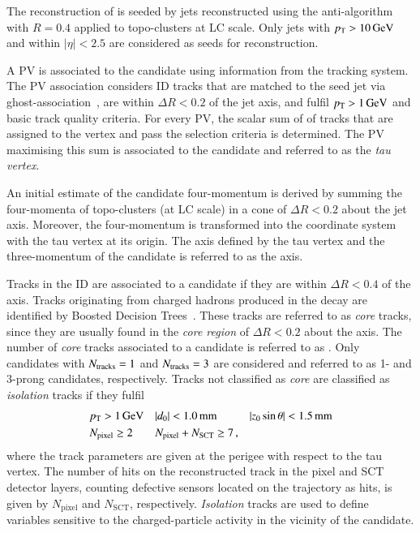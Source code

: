 The reconstruction of \tauhadvis is seeded by jets reconstructed using the
anti-\kt algorithm with $R = 0.4$ applied to topo-clusters at LC scale. Only
jets with $\pT > \SI{10}{\GeV}$ and within $|\eta| < 2.5$ are considered as
seeds for \tauhadvis reconstruction.

A PV is associated to the \tauhadvis candidate using information from the
tracking system. The PV association considers ID tracks that are matched to the
seed jet via ghost-association~\cite{Cacciari:2008gn}, are within
$\Delta R < 0.2$ of the jet axis, and fulfil $\pT > \SI{1}{\GeV}$ and basic
track quality criteria. For every PV, the scalar sum of \pT of tracks that are
assigned to the vertex and pass the selection criteria is determined. The PV
maximising this sum is associated to the \tauhadvis candidate and referred to as
the \emph{tau vertex}.

An initial estimate of the \tauhadvis candidate four-momentum is derived by
summing the four-momenta of topo-clusters (at LC scale) in a cone of
$\Delta R < 0.2$ about the jet axis. Moreover, the four-momentum is transformed
into the coordinate system with the tau vertex at its origin. The axis defined
by the tau vertex and the three-momentum of the \tauhadvis candidate is referred
to as the \tauhadvis axis.

Tracks in the ID are associated to a \tauhadvis candidate if they are within
$\Delta R < 0.4$ of the \tauhadvis axis. Tracks originating from charged hadrons
produced in the \taulepton decay are identified by Boosted Decision
Trees~\cite{duschinger}. These tracks are referred to as \emph{core} tracks,
since they are usually found in the \emph{core region} of $\Delta R < 0.2$ about
the \tauhadvis axis. The number of \emph{core} tracks associated to a \tauhadvis
candidate is referred to as \Ntracks. Only candidates with $N_{\text{tracks}} = 1$ and
$N_{\text{tracks}} = 3$ are considered and referred to as 1- and 3-prong \tauhadvis
candidates, respectively. Tracks not
classified as \emph{core} are classified as \emph{isolation} tracks if they
fulfil
\begin{align*}
  & p_{\text{T}} > \SI{1}{\ensuremath{\text{GeV}}} && |d_{0}| < \SI{1.0}{\milli\metre} && |z_{0} \sin\theta| < \SI{1.5}{\milli\metre} \\
  & N_{\text{pixel}} \geq 2 && N_{\text{pixel}} + N_{\text{SCT}} \geq 7 \,\text{,}
\end{align*}
where the track parameters are given at the perigee with respect to the tau
vertex. The number of hits on the reconstructed track in the pixel and SCT
detector layers, counting defective sensors located on the trajectory as hits,
is given by $N_{\text{pixel}}$ and $N_{\text{SCT}}$,
respectively. \emph{Isolation} tracks are used to define variables sensitive to
the charged-particle activity in the vicinity of the \tauhadvis candidate.

